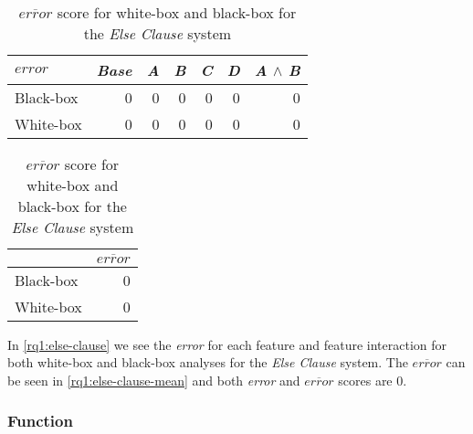 \begin{table}[H]
    \begin{minipage}{.5\linewidth}
        \centering
        \begin{tabular}{lrrrrrr}    \toprule
        $error$    & \emph{Base} & \emph{A} & \emph{B} & \emph{C} & \emph{D} & \emph{A} $\land$ \emph{B}   \\ \midrule
        Black-box & 0 & 0 & 0 & 0 & 0 & 0      \\
        White-box & 0 & 0 & 0 & 0 & 0 & 0      \\ \bottomrule
        \end{tabular}
        \caption{Respective \emph{error} scores for white-box and black-box {\perfInfluenceModel}s for the \emph{Else Clause} system.}
        \label{rq1:else-clause}
    \end{minipage}%
    \hspace{7mm}
    \begin{minipage}{.37\linewidth}
        \centering
        \begin{tabular}{lr}
            \toprule
                      & $\overline{error}$   \\ \midrule
            Black-box & 0              \\
            White-box & 0              \\ \bottomrule
            \end{tabular} 
            \caption{$\overline{error}$ score for white-box and black-box for the \emph{Else Clause} system}
            \label{rq1:else-clause-mean}
        \end{minipage}
    \end{table}
    
In \autoref{rq1:else-clause} we see the \emph{error} for each feature and feature interaction for both white-box and black-box 
analyses for the \emph{Else Clause} system. The $\overline{error}$ can be seen in \autoref{rq1:else-clause-mean} and 
both \emph{error} and $\overline{error}$ scores are $0$.

\subsubsection*{Function}

